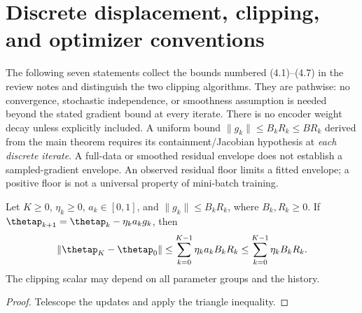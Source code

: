 \section{Discrete displacement, clipping, and optimizer conventions}
\label{sec:astra_discrete}
The following seven statements collect the bounds numbered (4.1)--(4.7)
in the review notes and distinguish the two clipping algorithms. They are
pathwise: no convergence, stochastic independence, or smoothness assumption
is needed beyond the stated gradient bound at every iterate. There is no
encoder weight decay unless explicitly included. A uniform bound
$\|g_k\|\le B_kR_k\le BR_k$ derived from the main theorem requires its
containment/Jacobian hypothesis at \emph{each discrete iterate}. A full-data
or smoothed residual envelope does not establish a sampled-gradient envelope.
An observed residual floor limits a fitted envelope; a positive floor is
not a universal property of mini-batch training.

\begin{lemma}
\label{lem:astra_gd}
Let $K\ge0$, $\eta_k\ge0$, $a_k\in[0,1]$, and
$\|g_k\|\le B_kR_k$, where $B_k,R_k\ge0$. If
$\thetap_{k+1}=\thetap_k-\eta_ka_kg_k$, then
\begin{equation}\label{eq:astra_gd}
 \|\thetap_K-\thetap_0\|
 \le\sum_{k=0}^{K-1}\eta_ka_kB_kR_k
 \le\sum_{k=0}^{K-1}\eta_kB_kR_k.
\end{equation}
The clipping scalar may depend on all parameter groups and the history.
\end{lemma}
\begin{proof}
Telescope the updates and apply the triangle inequality.
\end{proof}

